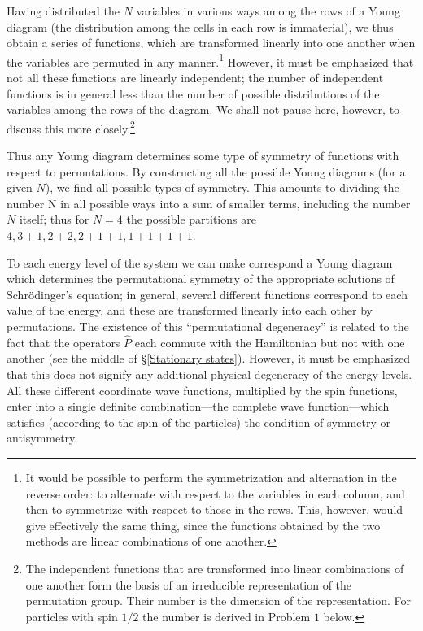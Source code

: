 Having distributed the $ N $ variables in various ways among the rows of a Young diagram (the distribution among the cells in each row is immaterial), we thus obtain a series of functions, which are transformed linearly into one another when the variables are permuted in any manner.\footnote{It would be possible to perform the symmetrization and alternation in the reverse order: to alternate with respect to the variables in each column, and then to symmetrize with respect to those in the rows. This, however, would give effectively the same thing, since the functions obtained by the two methods are linear combinations of one another.
} However, it must be emphasized that not all these functions are linearly independent; the number of independent functions is in general less than the number of possible distributions of the variables among the rows of the diagram. We shall not pause here, however, to discuss this more closely.\footnote{The independent functions that are transformed into linear combinations of one another form the basis of an irreducible representation of the permutation group. Their number is the dimension of the representation. For particles with spin $ 1/2 $ the number is derived in Problem $ 1 $ below.}

Thus any Young diagram determines some type of symmetry of functions with respect to permutations. By constructing all the possible Young diagrams (for a given $ N $), we find all possible types of symmetry. This amounts to dividing the number N in all possible ways into a sum of smaller terms, including the number $ N $ itself; thus for $ N = 4 $ the possible partitions are $ 4, 3+1, 2+2, 2+1+1, 1+1+1+1 $.

To each energy level of the system we can make correspond a Young diagram which determines the permutational symmetry of the appropriate solutions of Schr\"odinger’s equation; in general, several different functions correspond to each value of the energy, and these are transformed linearly into each other by permutations. The existence of this “permutational degeneracy” is related to the fact that the operators $ \hat{P} $ each commute with the Hamiltonian but not with one another (see the middle of \S\ref{Stationary states}). However, it must be emphasized that this does not signify any additional physical degeneracy of the energy levels. All these different coordinate wave functions, multiplied by the spin functions, enter into a single definite combination—the complete wave function—which satisfies (according to the spin of the particles) the condition of symmetry or antisymmetry.

